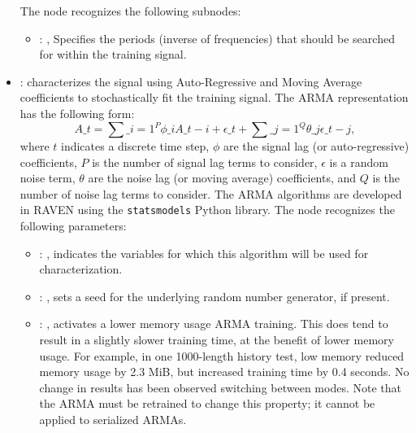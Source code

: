 \begin{itemize}
      The  node recognizes the following subnodes:
      \begin{itemize}
        \item {}: , 
          Specifies the periods (inverse of frequencies) that should be searched
          for within the training signal.
      \end{itemize}

    \item {}:
      characterizes the signal using Auto-Regressive and Moving Average         coefficients to
      stochastically fit the training signal.         The ARMA representation has the following
      form:         \begin{equation*}           A\_t = \sum\_{i=1}^P \phi\_i A\_{t-i} + \epsilon\_t +
      \sum\_{j=1}^Q \theta\_j \epsilon\_{t-j},         \end{equation*}         where $t$ indicates a
      discrete time step, $\phi$ are the signal lag (or auto-regressive)         coefficients, $P$
      is the number of signal lag terms to consider, $\epsilon$ is a random noise         term,
      $\theta$ are the noise lag (or moving average) coefficients, and $Q$ is the number of
      noise lag terms to consider. The ARMA algorithms are developed in RAVEN using the
      \texttt{statsmodels} Python library.
      The  node recognizes the following parameters:
        \begin{itemize}
          \item {}: , 
            indicates the variables for which this algorithm will be used for characterization.
          \item {}: , 
            sets a seed for the underlying random number generator, if present.
          \item {}: , 
            activates a lower memory usage ARMA training. This does tend to result
            in a slightly slower training time, at the benefit of lower memory usage. For
            example, in one 1000-length history test, low memory reduced memory usage by 2.3
            MiB, but increased training time by 0.4 seconds. No change in results has been
            observed switching between modes. Note that the ARMA must be
            retrained to change this property; it cannot be applied to serialized ARMAs. 
      \end{itemize}


\end{itemize}
